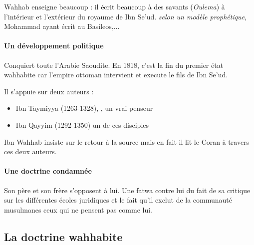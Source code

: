 Wahhab enseigne beaucoup  : il écrit beaucoup à des savants (\emph{Oulema}) à l'intérieur et l'extérieur du royaume de Ibn Se'ud. \textit{selon un modèle prophétique}, Mohammad ayant écrit au Basileos,... 

\paragraph{Un développement politique} Conquiert toute l'Arabie Saoudite. En 1818, c'est la fin du premier état wahhabite car l'empire ottoman intervient et execute le fils de Ibn Se'ud.
    
 Il s'appuie sur deux auteurs : 
\begin{itemize}
    \item Ibn Taymiyya (1263-1328), \label{Theol:Taymiyya2} , un vrai penseur
    \item Ibn Qayyim (1292-1350) un de ces disciples
\end{itemize}
 
Ibn Wahhab insiste sur le retour à la source mais en fait il lit le Coran à travers ces deux auteurs.

\paragraph{Une doctrine condamnée} Son père et son frère s'opposent à lui. Une fatwa contre lui du fait de sa critique sur les différentes écoles juridiques et le fait qu'il exclut de la communauté musulmanes ceux qui ne pensent pas comme lui. 

  \subsection{La doctrine wahhabite} 



